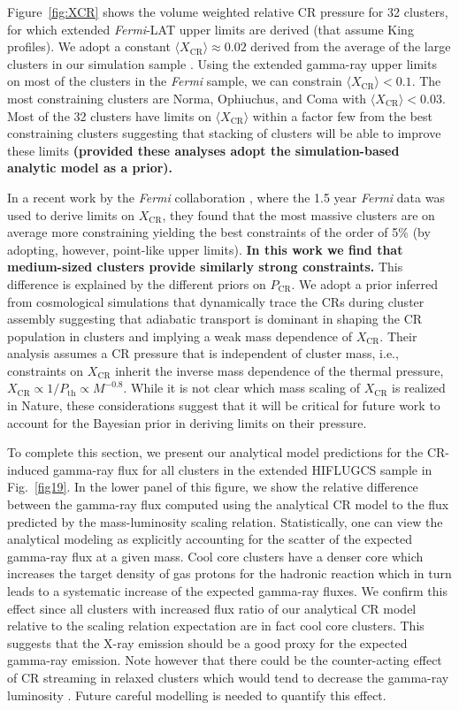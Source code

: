 \documentclass[10pt,aps,pra,reprint,amsmath,amsfonts,amssymb,showpacs,nofootinbib,floatfix]{revtex4-1}
\def\C#1{{\bf #1}}
\newcommand{\Fermi}{{\em Fermi}\xspace}
\newcommand{\rmn}{\mathrm}
\newcommand{\bra}{\langle}
\newcommand{\ket}{\rangle}
\newcommand{\CR}{\rmn{CR}}
\begin{document}
Figure~\ref{fig:XCR} shows the volume weighted relative CR pressure
for 32 clusters, for which extended \Fermi-LAT upper limits are
derived (that assume King profiles). We adopt a constant $\bra
X_\CR\ket\approx 0.02$ derived from the average of the large clusters
in our simulation sample \cite{2008MNRAS.385.1211P,
  2010MNRAS.409..449P}. Using the extended gamma-ray upper limits on
most of the clusters in the \Fermi sample, we can constrain $\bra
X_\CR \ket< 0.1$. The most constraining clusters are Norma, Ophiuchus,
and Coma with $\bra X_\CR\ket < 0.03$. Most of the 32 clusters have
limits on $\bra X_\CR\ket$ within a factor few from the best
constraining clusters suggesting that stacking of clusters will be
able to improve these limits \C{(provided these analyses adopt the
simulation-based analytic model \cite{2010MNRAS.409..449P} as a
prior).}

In a recent work by the \Fermi collaboration
\cite{2010ApJ...717L..71A}, where the 1.5 year \Fermi data was used to
derive limits on $X_\CR$, they found that the most massive clusters
are on average more constraining yielding the best constraints of the
order of 5\% (by adopting, however, point-like upper limits). \C{In
  this work we find that medium-sized clusters provide similarly
  strong constraints.}  This difference is explained by the different
priors on $P_\CR$.  We adopt a prior inferred from cosmological
simulations that dynamically trace the CRs during cluster assembly
suggesting that adiabatic transport is dominant in shaping the CR
population in clusters and implying a weak mass dependence of
$X_\CR$. Their analysis assumes a CR pressure that is independent of
cluster mass, i.e., constraints on $X_\CR$ inherit the inverse mass
dependence of the thermal pressure, $X_\CR\propto 1/P_\rmn{th}\propto
M^{-0.8}$. While it is not clear which mass scaling of $X_\CR$ is
realized in Nature, these considerations suggest that it will be
critical for future work to account for the Bayesian prior in deriving
limits on their pressure.

To complete this section, we present our analytical model predictions
for the CR-induced gamma-ray flux for all clusters in the extended
HIFLUGCS sample in Fig.~\ref{fig19}. In the lower panel of this
figure, we show the relative difference between the gamma-ray flux
computed using the analytical CR model to the flux predicted by the
mass-luminosity scaling relation. Statistically, one can view the
analytical modeling as explicitly accounting for the scatter of the expected
gamma-ray flux at a given mass. Cool core clusters have a denser core
which increases the target density of gas protons for the hadronic
reaction which in turn leads to a systematic increase of the expected
gamma-ray fluxes. We confirm this effect since all clusters with
increased flux ratio of our analytical CR model relative to the scaling relation
expectation are in fact cool core clusters. This suggests that the X-ray
emission should be a good proxy for the expected gamma-ray
emission. Note however that there could be the counter-acting effect
of CR streaming in relaxed clusters which would tend to decrease the
gamma-ray luminosity \cite{2011A&A...527A..99E}. Future careful
modelling is needed to quantify this effect.
\end{document}

